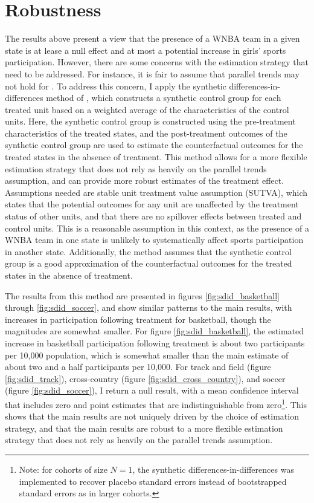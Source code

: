 \documentclass[11pt]{article}
\newcommand{\1}[1]{\mathbb{I}\{#1\}}
\theoremstyle{plain}
\begin{document}
\section{Robustness}

The results above present a view that the presence of a WNBA team in a given state is at lease a null effect and at most a potential increase in girls' sports participation. However, there are some concerns with the estimation strategy that need to be addressed. For instance, it is fair to assume that parallel trends may not hold for \cite{csa_2021}. To address this concern, I apply the synthetic differences-in-differences method of \cite{arkhangelsky_synthetic_2021}, which constructs a synthetic control group for each treated unit based on a weighted average of the characteristics of the control units. Here, the synthetic control group is constructed using the pre-treatment characteristics of the treated states, and the post-treatment outcomes of the synthetic control group are used to estimate the counterfactual outcomes for the treated states in the absence of treatment. This method allows for a more flexible estimation strategy that does not rely as heavily on the parallel trends assumption, and can provide more robust estimates of the treatment effect. Assumptions needed are stable unit treatment value assumption (SUTVA), which states that the potential outcomes for any unit are unaffected by the treatment status of other units, and that there are no spillover effects between treated and control units. This is a reasonable assumption in this context, as the presence of a WNBA team in one state is unlikely to systematically affect sports participation in another state. Additionally, the method assumes that the synthetic control group is a good approximation of the counterfactual outcomes for the treated states in the absence of treatment.

The results from this method are presented in figures \ref{fig:sdid_basketball} through \ref{fig:sdid_soccer}, and show similar patterns to the main results, with increases in participation following treatment for basketball, though the magnitudes are somewhat smaller. For figure \ref{fig:sdid_basketball}, the estimated increase in basketball participation following treatment is about two participants per 10,000 population, which is somewhat smaller than the main estimate of about two and a half participants per 10,000. For track and field (figure \ref{fig:sdid_track}), cross-country (figure \ref{fig:sdid_cross_country}), and soccer (figure \ref{fig:sdid_soccer}), I return a null result, with a mean confidence interval that includes zero and point estimates that are indistinguishable from zero\footnote{Note: for cohorts of size $N=1$, the synthetic differences-in-differences was implemented to recover placebo standard errors instead of bootstrapped standard errors as in larger cohorts.}. This shows that the main results are not uniquely driven by the choice of estimation strategy, and that the main results are robust to a more flexible estimation strategy that does not rely as heavily on the parallel trends assumption.
\end{document}
